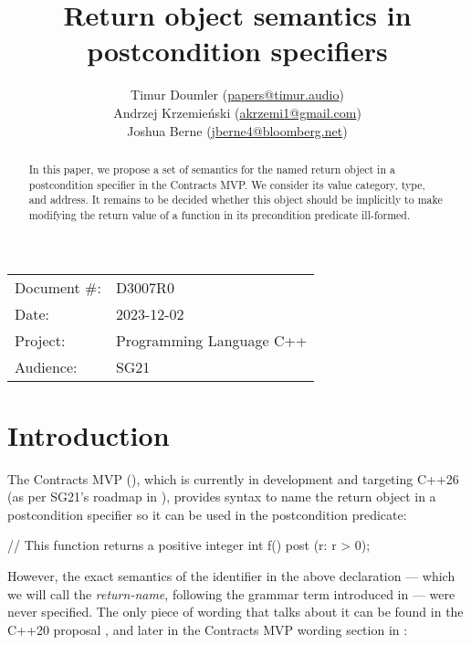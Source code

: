 


\title{Return object semantics in postcondition specifiers}
\author{ Timur Doumler \small(\href{mailto:papers@timur.audio}{papers@timur.audio}) \\
Andrzej Krzemie\' nski \small(\href{mailto:akrzemi1@gmail.com}{akrzemi1@gmail.com}) \\
Joshua Berne \small(\href{jberne4@bloomberg.net}{jberne4@bloomberg.net})
}
\date{}
\maketitle

\begin{tabular}{ll}
Document \#: & D3007R0 \\
Date: &2023-12-02 \\
Project: & Programming Language C++ \\
Audience: & SG21
\end{tabular}

\begin{abstract}
In this paper, we propose a set of semantics for the named return object in a postcondition specifier in the Contracts MVP. We consider its value category, type, and address. It remains to be decided whether this object should be implicitly  to make modifying the return value of a function in its precondition predicate ill-formed.
\end{abstract}

\section{Introduction}
\label{sec:intro}

The Contracts MVP (\cite{P2900R2}), which is currently in development and targeting C++26 (as per SG21's roadmap in \cite{P2695R1}), provides syntax to name the return object in a postcondition specifier so it can be used in the postcondition predicate:
\begin{codeblock}
// This function returns a positive integer
int f()
  post (r: r > 0);
\end{codeblock}
However, the exact semantics of the identifier  in the above declaration --- which we will call the \emph{return-name}, following the grammar term introduced in \cite{P2932R2} --- were never specified. The only piece of wording that talks about it can be found in the C++20 proposal \cite{P0542R5}, and later in the Contracts MVP wording section in \cite{P2388R4}:

